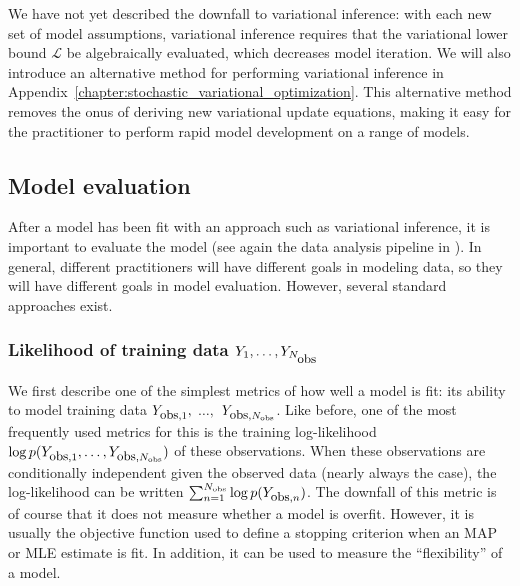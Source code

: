 We have not yet described the downfall to variational inference: with
each new set of model assumptions, variational inference requires that
the variational lower bound $\mathcal{L}$ be algebraically evaluated,
which decreases model iteration.  We will also introduce an
alternative method for performing variational inference in
Appendix~\ref{chapter:stochastic_variational_optimization}.  This
alternative method removes the onus of deriving new variational update
equations, making it easy for the practitioner to perform rapid model
development on a range of models.


\subsection{Model evaluation}
After a model has been fit with an approach such as variational
inference, it is important to evaluate the model (see again the data
analysis pipeline in ).  In general,
different practitioners will have different goals in modeling data, so
they will have different goals in model evaluation.  However, several
standard approaches exist.

\subsubsection{Likelihood of training data $Y_1, \ldots,
  Y_{N_{\mbox{\small obs}}}$}
We first describe one of the simplest metrics of how well a model is
fit: its ability to model training data $Y_{\mbox{\small obs},1},$
$\ldots,$ $Y_{\mbox{\small obs},N_{\mbox{\tiny obs}}}$.  Like before,
one of the most frequently used metrics for this is the training
log-likelihood $\log p(Y_{\mbox{\small obs},1}, \ldots,
Y_{\mbox{\small obs},N_{\mbox{\tiny obs}}})$ of these
observations. When these observations are conditionally independent
given the observed data (nearly always the case), the log-likelihood
can be written $\sum_{n=1}^{N_{\mbox{\tiny obs}}} \log
p(Y_{\mbox{\small obs},n})$.  The downfall of this metric is of course
that it does not measure whether a model is overfit.  However, it is
usually the objective function used to define a stopping criterion
when an MAP or MLE estimate is fit.  In addition, it can be used to
measure the ``flexibility'' of a model.


